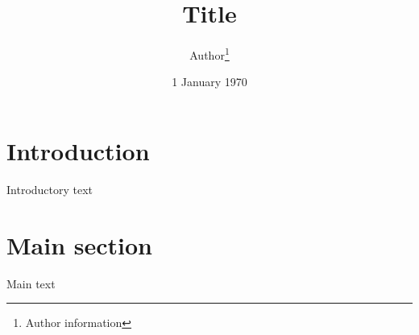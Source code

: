 \documentclass[11pt, a4paper, british]{article}
\begin{document}
	\title{Title}
	\author{Author\thanks{Author information}}
	\date{1 January 1970}

	\maketitle

	\section{Introduction}

		Introductory text

	\section{Main section}

		Main text
\end{document}
